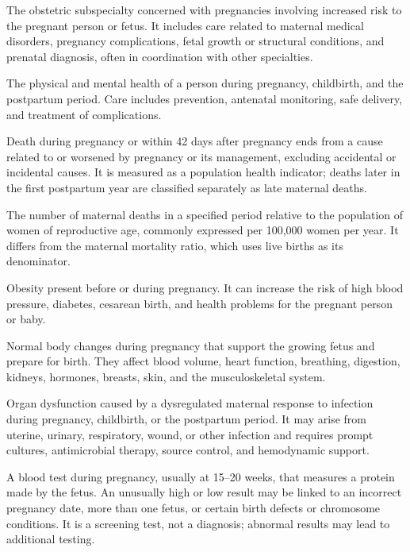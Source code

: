  The obstetric subspecialty concerned with pregnancies involving increased
risk to the pregnant person or fetus. It includes care related to maternal medical disorders,
pregnancy complications, fetal growth or structural conditions, and prenatal diagnosis,
often in coordination with other specialties.

 The physical and mental health of a person during pregnancy, childbirth, and the postpartum period. Care includes prevention, antenatal monitoring, safe delivery, and treatment of complications.

 Death during pregnancy or within 42 days after pregnancy ends from a cause related to or worsened by pregnancy or its management, excluding accidental or incidental causes. It is measured as a population health indicator; deaths later in the first postpartum year are classified separately as late maternal deaths.

 The number of maternal deaths in a specified period relative to the population of women of reproductive age, commonly expressed per 100,000 women per year. It differs from the maternal mortality ratio, which uses live births as its denominator.

 Obesity present before or during pregnancy. It can increase the risk of high blood pressure, diabetes, cesarean birth, and health problems for the pregnant person or baby.

 Normal body changes during pregnancy that support the growing fetus and prepare for birth. They affect blood volume, heart function, breathing, digestion, kidneys, hormones, breasts, skin, and the musculoskeletal system.

 Organ dysfunction caused by a dysregulated maternal response to infection during
pregnancy, childbirth, or the postpartum period. It may arise from uterine, urinary,
respiratory, wound, or other infection and requires prompt cultures, antimicrobial
therapy, source control, and hemodynamic support.

 A blood test during pregnancy, usually at 15--20 weeks, that measures a protein made by the fetus. An unusually high or low result may be linked to an incorrect pregnancy date, more than one fetus, or certain birth defects or chromosome conditions. It is a screening test, not a diagnosis; abnormal results may lead to additional testing.

